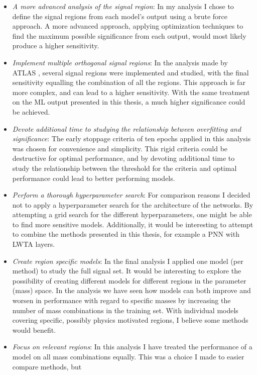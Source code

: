 \begin{itemize}
    \item \emph{A more advanced analysis of the signal region}: In my analysis I chose to define the signal regions from each model's output using a brute force approach. 
          A more advanced approach, applying optimization techniques to find the maximum possible significance from each output, would most likely produce a higher sensitivity.
    \item \emph{Implement multiple orthogonal signal regions}: In the analysis made by \ac{ATLAS} \cite{atlas_search_2021}, several signal regions were implemented and studied,
           with the final sensitivity equalling the combination of all the regions. This approach is far more complex, and can lead to a higher sensitivity. With the same 
           treatment on the \ac{ML} output presented in this thesis, a much higher significance could be achieved. 
    \item \emph{Devote additional time to studying the relationship between overfitting and significance}: The early stoppage criteria of ten epochs applied in this analysis was chosen 
          for convenience and simplicity. This rigid criteria could be destructive for optimal performance, and by devoting additional time to study
          the relationship between the threshold for the criteria and optimal performance could lead to better performing models.
    \item \emph{Perform a thorough hyperparameter search}: For comparison reasons I decided not to apply a hyperparameter search for the architecture of the networks. By attempting 
           a grid search for the different hyperparameters, one might be able to find more sensitive models. Additionally, it would be interesting to attempt to combine the methods presented 
           in this thesis, for example a \ac{PNN} with \ac{LWTA} layers. 
    \item \emph{Create region specific models}: In the final analysis I applied one model (per method) to study the full signal set. It would be interesting to explore the possibility of creating
          different models for different regions in the parameter (mass) space. In the analysis we have seen how models can both improve and worsen in performance with regard to specific masses by increasing
          the number of mass combinations in the training set. With individual models covering specific, possibly physics motivated regions, I believe some methods would benefit.
    \item \emph{Focus on relevant regions}: In this analysis I have treated the performance of a model on all mass combinations equally. This was a choice I made to easier compare methods, but 

\end{itemize}
